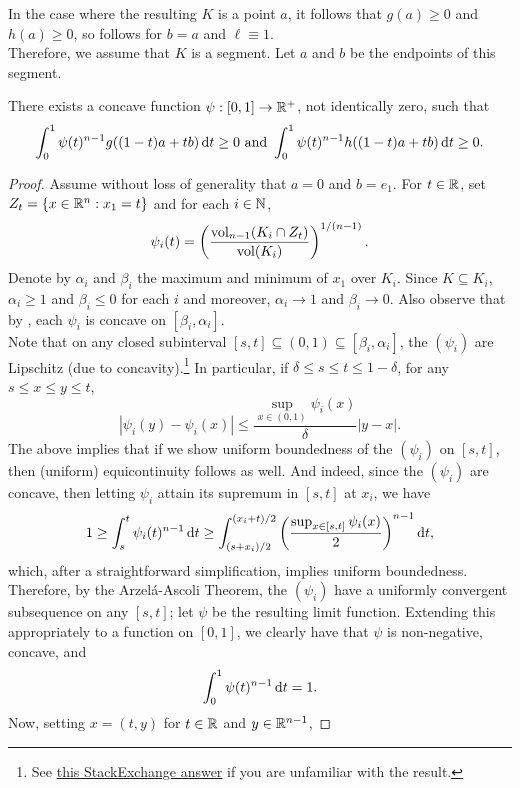 In the case where the resulting $K$ is a point $a$, it follows that $g(a)\geq 0$ and $h(a)\geq 0$, so  follows for $b=a$ and $\ell\equiv 1$.\\
Therefore, we assume that $K$ is a segment. Let $a$ and $b$ be the endpoints of this segment.

\begin{lemma}
\label{localization lemma lemma 2}
	There exists a concave function $\psi:[0,1]\to\mathbb{R}^+$, not identically zero, such that
	\[ \int_0^1 \psi(t)^{n-1}g((1-t)a+tb)\operatorname{d}\!{t} \geq 0 \text{ and } \int_0^1 \psi(t)^{n-1}h((1-t)a+tb)\operatorname{d}\!{t} \geq 0. \]
\end{lemma}
\begin{proof}
	Assume without loss of generality that $a=0$ and $b=e_1$. For $t\in\mathbb{R}$, set $Z_t = \{x\in\mathbb{R}^n : x_1=t\}$ and for each $i\in\mathbb{N}$,
	\[ \psi_i(t) = \left(\frac{\operatorname{vol}_{n-1}(K_i\cap Z_t)}{\operatorname{vol}(K_i)}\right)^{1/(n-1)}. \]
	Denote by $\alpha_i$ and $\beta_i$ the maximum and minimum of $x_1$ over $K_i$. Since $K\subseteq K_i$, $\alpha_i\geq 1$ and $\beta_i\leq 0$ for each $i$ and moreover, $\alpha_i\to 1$ and $\beta_i\to 0$. Also observe that by , each $\psi_i$ is concave on $[\beta_i,\alpha_i]$.\\
	Note that on any closed subinterval $[s,t]\subseteq(0,1)\subseteq[\beta_i,\alpha_i]$, the $(\psi_i)$ are Lipschitz (due to concavity).\footnote{See \href{https://math.stackexchange.com/a/2662341/447210}{this StackExchange answer} if you are unfamiliar with the result.} In particular, if $\delta\leq s\leq t\leq 1-\delta$, for any $s\leq x\leq y\leq t$,
	\[ |\psi_i(y)-\psi_i(x)| \leq \frac{\sup_{x\in (0,1)} \psi_i(x)}{\delta} |y-x|. \]
	The above implies that if we show uniform boundedness of the $(\psi_i)$ on $[s,t]$, then (uniform) equicontinuity follows as well. And indeed, since the $(\psi_i)$ are concave, then letting $\psi_i$ attain its supremum in $[s,t]$ at $x_i$, we have 
	\[ 1 \geq \int_s^t \psi_i(t)^{n-1}\operatorname{d}\!{t} \geq \int_{(s+x_i)/2}^{(x_i+t)/2} \left(\frac{\sup_{x\in[s,t]} \psi_i(x)}{2}\right)^{n-1}\operatorname{d}\!{t}, \]
	which, after a straightforward simplification, implies uniform boundedness.\\
	Therefore, by the Arzel\'a-Ascoli Theorem, the $(\psi_i)$ have a uniformly convergent subsequence on any $[s,t]$; let $\psi$ be the resulting limit function. Extending this appropriately to a function on $[0,1]$, we clearly have that $\psi$ is non-negative, concave, and
	\[ \int_0^1 \psi(t)^{n-1}\operatorname{d}\!{t} = 1. \]
	Now, setting $x=(t,y)$ for $t\in\mathbb{R}$ and $y\in\mathbb{R}^{n-1}$,

\end{proof}

